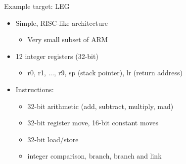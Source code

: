 \begin{frame}{Example target: LEG}

\begin{itemize}
    \item Simple, RISC-like architecture
    \begin{itemize}
        \item Very small subset of ARM
    \end{itemize}
    \item 12 integer registers (32-bit)
    \begin{itemize}
        \item r0, r1, ..., r9, sp (stack pointer), lr (return address)
    \end{itemize}
    \item Instructions:
    \begin{itemize}
        \item 32-bit arithmetic (add, subtract, multiply, mad)
        \item 32-bit register move, 16-bit constant moves
        \item 32-bit load/store
        \item integer comparison, branch, branch and link
    \end{itemize}
\end{itemize}

\end{frame}


